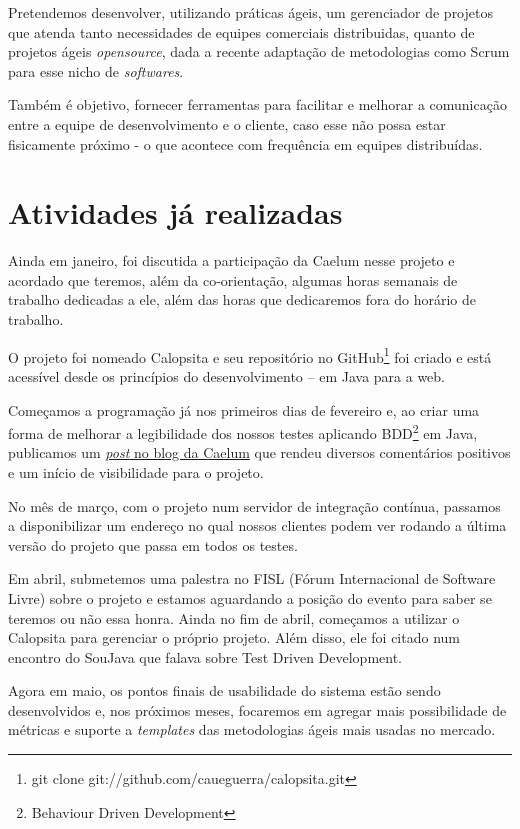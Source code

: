 \documentclass[titlepage]{article}
\begin{document}
Pretendemos desenvolver, utilizando práticas ágeis, um gerenciador de projetos que atenda tanto necessidades de equipes comerciais distribuidas, quanto de projetos ágeis \textit{opensource}, dada a recente adaptação de metodologias como Scrum para esse nicho de \textit{softwares}.

Também é objetivo, fornecer ferramentas para facilitar e melhorar a comunicação entre a equipe de desenvolvimento e o cliente, caso esse não possa estar fisicamente próximo - o que acontece com frequência em equipes distribuídas.

\section{Atividades já realizadas}
Ainda em janeiro, foi discutida a participação da Caelum nesse projeto e acordado que teremos, além da co-orientação, algumas horas semanais de trabalho dedicadas a ele, além das horas que dedicaremos fora do horário de trabalho.

O projeto foi nomeado Calopsita e seu repositório no GitHub\footnote{git clone git://github.com/caueguerra/calopsita.git} foi criado e está acessível desde os princípios do desenvolvimento -- em Java para a web.

Começamos a programação já nos primeiros dias de fevereiro e, ao criar uma forma de melhorar a legibilidade dos nossos testes aplicando BDD\footnote{Behaviour Driven Development} em Java, publicamos um \href{http://blog.caelum.com.br/2009/02/28/behavior-driven-development-com-junit/}{\textit{post} no blog da Caelum} que rendeu diversos comentários positivos e um início de visibilidade para o projeto.

No mês de março, com o projeto num servidor de integração contínua, passamos a disponibilizar um endereço no qual nossos clientes podem ver rodando a última versão do projeto que passa em todos os testes.

Em abril, submetemos uma palestra no FISL (Fórum Internacional de Software Livre) sobre o projeto e estamos aguardando a posição do evento para saber se teremos ou não essa honra. Ainda no fim de abril, começamos a utilizar o Calopsita para gerenciar o próprio projeto. Além disso, ele foi citado num encontro do SouJava que falava sobre Test Driven Development.

Agora em maio, os pontos finais de usabilidade do sistema estão sendo desenvolvidos e, nos próximos meses, focaremos em agregar mais possibilidade de métricas e suporte a \textit{templates} das metodologias ágeis mais usadas no mercado.
\end{document}
